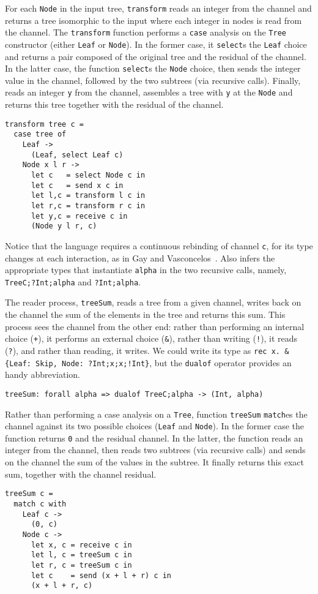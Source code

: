 For each \lstinline|Node| in the input tree, \lstinline|transform|
reads an integer from the channel and returns a tree isomorphic to the
input where each integer in nodes is read from the channel.
%
The \lstinline|transform| function performs a \lstinline|case|
analysis on the \lstinline|Tree| constructor (either \lstinline|Leaf|
or \lstinline|Node|). In the former case, it \lstinline|select|s the
\lstinline|Leaf| choice and returns a pair composed of the original
tree and the residual of the channel. In the latter case, the function
\lstinline|select|s the \lstinline|Node| choice, then sends the
integer value in the channel, followed by the two subtrees (via recursive
calls). Finally, reads an integer \lstinline|y| from the channel,
assembles a tree with \lstinline|y| at the \lstinline|Node| and
returns this tree together with the residual of the channel.
%
\begin{lstlisting}
transform tree c =
  case tree of
    Leaf ->
      (Leaf, select Leaf c)
    Node x l r ->
      let c   = select Node c in
      let c   = send x c in
      let l,c = transform l c in
      let r,c = transform r c in
      let y,c = receive c in
      (Node y l r, c)
\end{lstlisting}

Notice that the language requires a continuous rebinding of channel
\lstinline|c|, for its type changes at each interaction, as in Gay and
Vasconcelos~\cite{DBLP:journals/jfp/GayV10}. Also \freest{} infers the
appropriate types that instantiate \lstinline|alpha| in the two
recursive calls, namely, \lstinline|TreeC;?Int;alpha| and
\lstinline|?Int;alpha|.

The reader process, \lstinline|treeSum|, reads a tree from a given
channel, writes back on the channel the sum of the elements in the
tree and returns this sum. This process sees the channel from the
other end: rather than performing an internal choice (\lstinline|+|),
it performs an external choice (\lstinline|&|), rather than writing
(\lstinline|!|), it reads (\lstinline|?|), and rather than reading, it
writes. We could write its type as
\lstinline|rec x. &{Leaf: Skip, Node: ?Int;x;x;!Int}|,
but the \lstinline|dualof| operator provides an handy abbreviation.
%
\begin{lstlisting}
treeSum: forall alpha => dualof TreeC;alpha -> (Int, alpha)
\end{lstlisting}

Rather than performing a case analysis on a \lstinline|Tree|, function
\lstinline|treeSum| \lstinline|match|es the channel against its two
possible choices (\lstinline|Leaf| and \lstinline|Node|). In the
former case the function returns \lstinline|0| and the residual
channel. In the latter, the function reads an integer from the
channel, then reads two subtrees (via recursive calls) and sends on
the channel the sum of the values in the subtree. It finally returns
this exact sum, together with the channel residual.
%
\begin{lstlisting}
treeSum c =
  match c with
    Leaf c ->
      (0, c)
    Node c ->
      let x, c = receive c in
      let l, c = treeSum c in
      let r, c = treeSum c in
      let c    = send (x + l + r) c in
      (x + l + r, c)
\end{lstlisting}


